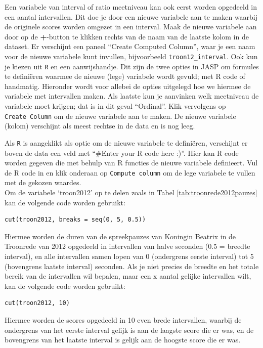 \documentclass[
]{book}
\begin{document}
Een variabele van interval of ratio meetniveau kan ook eerst worden opgedeeld in een aantal intervallen. Dit doe je door een nieuwe variabele aan te maken waarbij de originele scores worden omgezet in een interval. Maak de nieuwe variabele aan door op de \textbf{+}-button te klikken rechts van de naam van de laatste kolom in de dataset. Er verschijnt een paneel ``Create Computed Column'', waar je een naam voor de nieuwe variabele kunt invullen, bijvoorbeeld \texttt{troon12\_interval}. Ook kun je kiezen uit \texttt{R} en een aanwijshandje. Dit zijn de twee opties in JASP om formules te definiëren waarmee de nieuwe (lege) variabele wordt gevuld; met R code of handmatig. Hieronder wordt voor allebei de opties uitgelegd hoe we hiermee de variabele met intervallen maken. Als laatste kun je aanvinken welk meetniveau de variabele moet krijgen; dat is in dit geval ``Ordinal''. Klik vervolgens op \texttt{Create\ Column} om de nieuwe variabele aan te maken. De nieuwe variabele (kolom) verschijnt als meest rechtse in de data en is nog leeg.

Als \texttt{R} is aangeklikt als optie om de nieuwe variabele te definiëren, verschijnt er boven de data een veld met ``\#Enter your R code here :)''. Hier kan R code worden gegeven die met behulp van R functies de nieuwe variabele definieert. Vul de R code in en klik onderaan op \texttt{Compute\ column} om de lege variabele te vullen met de gekozen waardes.\\
Om de variabele `troon2012' op te delen zoals in Tabel \ref{tab:troonrede2012pauzes} kan de volgende code worden gebruikt:

\begin{verbatim}
cut(troon2012, breaks = seq(0, 5, 0.5)) 
\end{verbatim}

Hiermee worden de duren van de spreekpauzes van Koningin Beatrix in de Troonrede van 2012 opgedeeld in intervallen van halve seconden (0.5 = breedte interval), en alle intervallen samen lopen van 0 (ondergrens eerste interval) tot 5 (bovengrens laatste interval) seconden. Als je niet precies de breedte en het totale bereik van de intervallen wil bepalen, maar een x aantal gelijke intervallen wilt, kan de volgende code worden gebruikt:

\begin{verbatim}
cut(troon2012, 10) 
\end{verbatim}

Hiermee worden de scores opgedeeld in 10 even brede intervallen, waarbij de ondergrens van het eerste interval gelijk is aan de laagste score die er was, en de bovengrens van het laatste interval is gelijk aan de hoogste score die er was.
\end{document}
